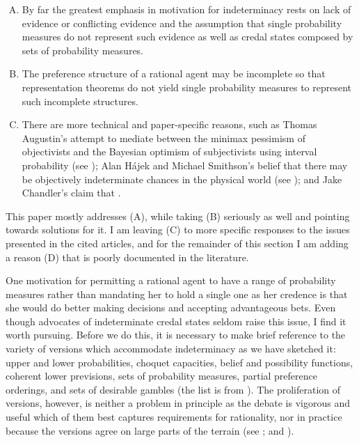 \begin{enumerate}[(A)]
\item By far the greatest emphasis in motivation for indeterminacy rests on lack of evidence or conflicting evidence and the assumption that single probability measures do not represent such evidence as well as credal states composed by sets of probability measures.
\item The preference structure of a rational agent may be incomplete so that representation theorems do not yield single probability measures to represent such incomplete structures.
\item There are more technical and paper-specific reasons, such as Thomas Augustin's attempt to mediate between the minimax pessimism of objectivists and the Bayesian optimism of subjectivists using interval probability (see ); Alan H{\'a}jek and Michael Smithson's belief that there may be objectively indeterminate chances in the physical world (see ); and Jake Chandler's claim that  .
\end{enumerate}

This paper mostly addresses (A), while taking (B) seriously as well and pointing towards solutions for it. I am leaving (C) to more specific responses to the issues presented in the cited articles, and for the remainder of this section I am adding a reason (D) that is poorly documented in the literature.

One motivation for permitting a rational agent to have a range of probability measures rather than mandating her to hold a single one as her credence is that she would do better making decisions and accepting advantageous bets. Even though advocates of indeterminate credal states seldom raise this issue, I find it worth pursuing. Before we do this, it is necessary to make brief reference to the variety of versions which accommodate indeterminacy as we have sketched it: upper and lower probabilities, choquet capacities, belief and possibility functions, coherent lower previsions, sets of probability measures, partial preference orderings, and sets of desirable gambles (the list is from ). The proliferation of versions, however, is neither a problem in principle as the debate is vigorous and useful which of them best captures requirements for rationality, nor in practice because the versions agree on large parts of the terrain (see ; and ).


